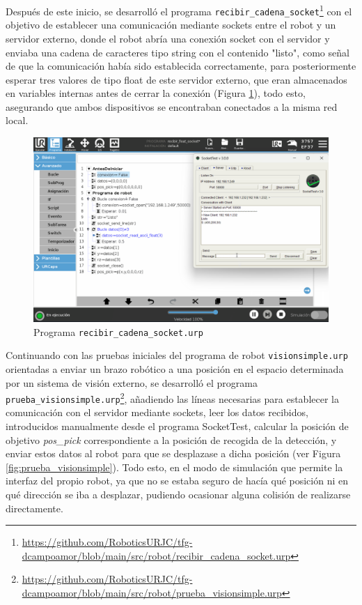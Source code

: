 Después de este inicio, se desarrolló el programa \verb|recibir_cadena_socket|\footnote{\url{https://github.com/RoboticsURJC/tfg-dcampoamor/blob/main/src/robot/recibir_cadena_socket.urp}} con el objetivo de establecer una comunicación mediante sockets entre el robot y un servidor externo, donde el robot abría una conexión socket con el servidor y enviaba una cadena de caracteres tipo string con el contenido "listo", como señal de que la comunicación había sido establecida correctamente, para posteriormente esperar tres valores de tipo float de este servidor externo, que eran almacenados en variables internas antes de cerrar la conexión (Figura \ref{fig:recibir_cadena_socket}), todo esto, asegurando que ambos dispositivos se encontraban conectados a la misma red local.

   \begin{figure}[H]
     \centering
     \begin{center}
       \includegraphics[width=155mm]{figs/recibir_cadena_socket.png}
     \end{center}
     \caption{Programa \texttt{recibir\_cadena\_socket.urp}}
     \label{fig:recibir_cadena_socket}
  \end{figure}

Continuando con las pruebas iniciales del programa de robot \verb|visionsimple.urp| orientadas a enviar un brazo robótico a una posición en el espacio determinada por un sistema de visión externo, se desarrolló el programa \verb|prueba_visionsimple.urp|\footnote{\url{https://github.com/RoboticsURJC/tfg-dcampoamor/blob/main/src/robot/prueba_visionsimple.urp}}, añadiendo las líneas necesarias para establecer la comunicación con el servidor mediante sockets, leer los datos recibidos, introducidos manualmente desde el programa SocketTest, calcular la posición de objetivo \textit{pos\_pick} correspondiente a la posición de recogida de la detección, y enviar estos datos al robot para que se desplazase a dicha posición (ver Figura \ref{fig:prueba_visionsimple}). Todo esto, en el modo de simulación que permite la interfaz del propio robot, ya que no se estaba seguro de hacía qué posición ni en qué dirección se iba a desplazar, pudiendo ocasionar alguna colisión de realizarse directamente. 

